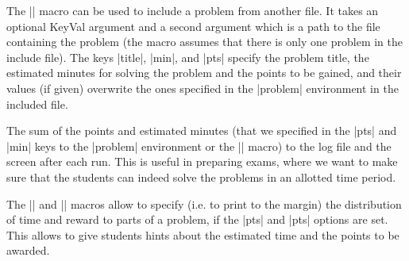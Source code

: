 \begin{function}{}
  The || macro can be used to include a problem from another file. It takes
  an optional KeyVal argument and a second argument which is a path to the file containing
  the problem (the macro assumes that there is only one problem in the include file). The
  keys |title|, |min|, and |pts| specify the problem title, the estimated minutes for
  solving the problem and the points to be gained, and their values (if given) overwrite
  the ones specified in the |problem| environment in the included file.
\end{function}

The sum of the points and estimated minutes (that we specified in the |pts| and |min| keys
to the |problem| environment or the || macro) to the log file and the
screen after each run. This is useful in preparing exams, where we want to make sure that
the students can indeed solve the problems in an allotted time period.

The |\min| and |\pts| macros allow to specify (i.e. to print to the margin) the
distribution of time and reward to parts of a problem, if the |pts| and |pts| options are
set. This allows to give students hints about the estimated time and the points to be
awarded.

